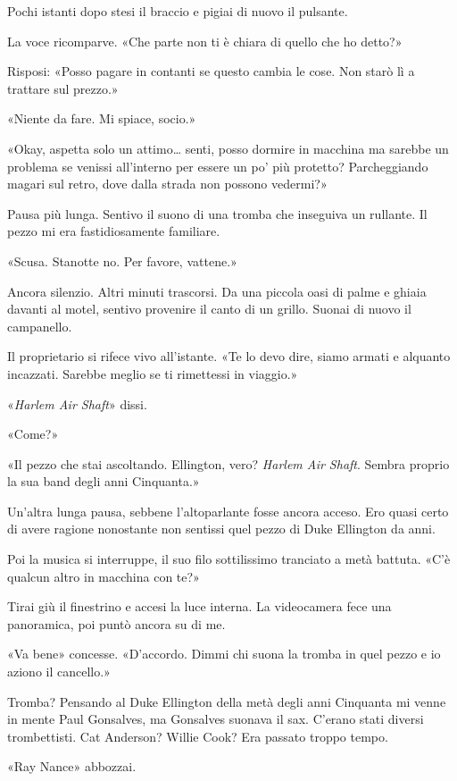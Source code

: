 Pochi istanti dopo stesi il braccio e pigiai di nuovo il pulsante.

La voce ricomparve. «Che parte non ti è chiara di quello che ho detto?»

Risposi: «Posso pagare in contanti se questo cambia le cose. Non starò
lì a trattare sul prezzo.»

«Niente da fare. Mi spiace, socio.»

«Okay, aspetta solo un attimo\ldots{} senti, posso dormire in macchina
ma sarebbe un problema se venissi all'interno per essere un po' più
protetto? Parcheggiando magari sul retro, dove dalla strada non possono
vedermi?»

Pausa più lunga. Sentivo il suono di una tromba che inseguiva un
rullante. Il pezzo mi era fastidiosamente familiare.

«Scusa. Stanotte no. Per favore, vattene.»

Ancora silenzio. Altri minuti trascorsi. Da una piccola oasi di palme e
ghiaia davanti al motel, sentivo provenire il canto di un grillo. Suonai
di nuovo il campanello.

Il proprietario si rifece vivo all'istante. «Te lo devo dire, siamo
armati e alquanto incazzati. Sarebbe meglio se ti rimettessi in
viaggio.»

«\emph{Harlem Air Shaft}» dissi.

«Come?»

«Il pezzo che stai ascoltando. Ellington, vero? \emph{Harlem Air Shaft}.
Sembra proprio la sua band degli anni Cinquanta.»

Un'altra lunga pausa, sebbene l'altoparlante fosse ancora acceso. Ero
quasi certo di avere ragione nonostante non sentissi quel pezzo di Duke
Ellington da anni.

Poi la musica si interruppe, il suo filo sottilissimo tranciato a metà
battuta. «C'è qualcun altro in macchina con te?»

Tirai giù il finestrino e accesi la luce interna. La videocamera fece
una panoramica, poi puntò ancora su di me.

«Va bene» concesse. «D'accordo. Dimmi chi suona la tromba in quel pezzo
e io aziono il cancello.»

Tromba? Pensando al Duke Ellington della metà degli anni Cinquanta mi
venne in mente Paul Gonsalves, ma Gonsalves suonava il sax. C'erano
stati diversi trombettisti. Cat Anderson? Willie Cook? Era passato
troppo tempo.

«Ray Nance» abbozzai.

